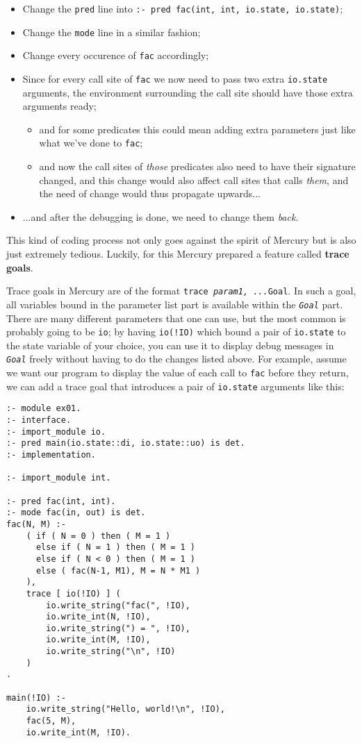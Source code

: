\begin{itemize}
\item Change the \texttt{pred} line into \texttt{:- pred fac(int, int, io.state, io.state)};
\item Change the \texttt{mode} line in a similar fashion;
\item Change every occurence of \texttt{fac} accordingly;
\item Since for every call site of \texttt{fac} we now need to pass two extra \texttt{io.state} arguments, the environment surrounding the call site should have those extra arguments ready;
  \begin{itemize}
  \item and for some predicates this could mean adding extra parameters just like what we've done to \texttt{fac};
  \item and now the call sites of \textit{those} predicates also need to have their signature changed, and this change would also affect call sites that calls \textit{them}, and the need of change would thus propagate upwards...
  \end{itemize}

  \item ...and after the debugging is done, we need to change them \textit{back}.
\end{itemize}

This kind of coding process not only goes against the spirit of Mercury but is also just extremely tedious. Luckily, for this Mercury prepared a feature called \textbf{trace goals}.

Trace goals in Mercury are of the format \texttt{trace \lbrack\textit{param1, ...}\rbrack  \;\texttt{Goal}}. In such a goal, all variables bound in the parameter list part is available within the \texttt{\textit{Goal}} part. There are many different parameters that one can use, but the most common is probably going to be \texttt{io}; by having \texttt{io(!IO)} which bound a pair of \texttt{io.state} to the state variable of your choice, you can use it to display debug messages in \texttt{\textit{Goal}} freely without having to do the changes listed above. For example, assume we want our program to display the value of each call to \texttt{fac} before they return, we can add a trace goal that introduces a pair of \texttt{io.state} arguments like this:

\begin{lstlisting}[language=Mercury]
:- module ex01.
:- interface.
:- import_module io.
:- pred main(io.state::di, io.state::uo) is det.
:- implementation.

:- import_module int.

:- pred fac(int, int).
:- mode fac(in, out) is det.
fac(N, M) :-
	( if ( N = 0 ) then ( M = 1 )
	  else if ( N = 1 ) then ( M = 1 )
	  else if ( N < 0 ) then ( M = 1 )
	  else ( fac(N-1, M1), M = N * M1 )
	),
	trace [ io(!IO) ] (
		io.write_string("fac(", !IO),
		io.write_int(N, !IO),
		io.write_string(") = ", !IO),
		io.write_int(M, !IO),
		io.write_string("\n", !IO)
	)
.

main(!IO) :-
    io.write_string("Hello, world!\n", !IO),
	fac(5, M),
	io.write_int(M, !IO).
\end{lstlisting}

